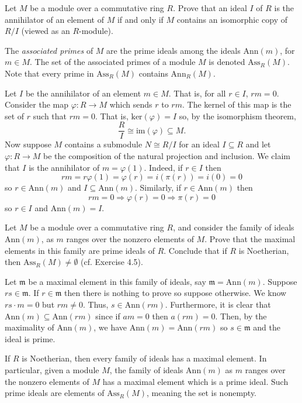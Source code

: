 \documentclass[../../master.tex]{subfiles}
\begin{document}
\begin{problem}
    Let $M$ be a module over a commutative ring $R$.
    Prove that an ideal $I$ of $R$ is the annihilator of an element of $M$ if and only if $M$ contains an isomorphic copy of $R / I$ (viewed as an $R$-module).

    The \textit{associated primes} of $M$ are the prime ideals among the ideals $\text{Ann}(m)$, for $m \in M$.
    The set of the associated primes of a module $M$ is denoted $\text{Ass}_R(M)$.
    Note that every prime in $\text{Ass}_R(M)$ contains $\text{Ann}_R(M)$.
\end{problem}

\begin{solution}
    Let $I$ be the annihilator of an element $m \in M$.
    That is, for all $r \in I$, $rm = 0$.
    Consider the map $\varphi : R \to M$ which sends $r$ to $rm$.
    The kernel of this map is the set of $r$ such that $rm = 0$.
    That is, $\text{ker}(\varphi) = I$ so, by the isomorphism theorem,
    \[
        \frac{R}{I} \cong \text{im}(\varphi) \subseteq M.
    \]
    Now suppose $M$ contains a submodule $N \cong R / I$ for an ideal $I \subseteq R$ and let $\varphi: R \to M$ be the composition of the natural projection and inclusion.
    We claim that $I$ is the annihilator of $m = \varphi(1)$.
    Indeed, if $r \in I$ then
    \[
        rm = r\varphi(1) = \varphi(r) = i(\pi(r)) = i(0) = 0
    \]
    so $r \in \text{Ann}(m)$ and $I \subseteq \text{Ann}(m)$.
    Similarly, if $r \in \text{Ann}(m)$ then
    \[
        rm = 0 \Longrightarrow \varphi(r) = 0 \Longrightarrow \pi(r) = 0
    \]
    so $r \in I$ and $\text{Ann}(m) = I$.
\end{solution}

\begin{problem}
    Let $M$ be a module over a commutative ring $R$, and consider the family of ideals $\text{Ann}(m)$, as $m$ ranges over the nonzero elements of $M$.
    Prove that the maximal elements in this family are prime ideals of $R$.
    Conclude that if $R$ is Noetherian, then $\text{Ass}_R(M) \neq \emptyset$ (cf. Exercise 4.5).
\end{problem}

\begin{solution}
    Let $\mathfrak{m}$ be a maximal element in this family of ideals, say $\mathfrak{m} = \text{Ann}(m)$.
    Suppose $rs \in \mathfrak{m}$.
    If $r \in \mathfrak{m}$ then there is nothing to prove so suppose otherwise.
    We know $rs \cdot m = 0$ but $rm \neq 0$.
    Thus, $s \in \text{Ann}(rm)$.
    Furthermore, it is clear that $\text{Ann}(m) \subseteq \text{Ann}(rm)$ since if $am = 0$ then $a (rm) = 0$.
    Then, by the maximality of $\text{Ann}(m)$, we have $\text{Ann}(m) = \text{Ann}(rm)$ so $s \in \mathfrak{m}$ and the ideal is prime.

    If $R$ is Noetherian, then every family of ideals has a maximal element.
    In particular, given a module $M$, the family of ideals $\text{Ann}(m)$ as $m$ ranges over the nonzero elements of $M$ has a maximal element which is a prime ideal.
    Such prime ideals are elements of $\text{Ass}_R(M)$, meaning the set is nonempty.
\end{solution}
\end{document}
